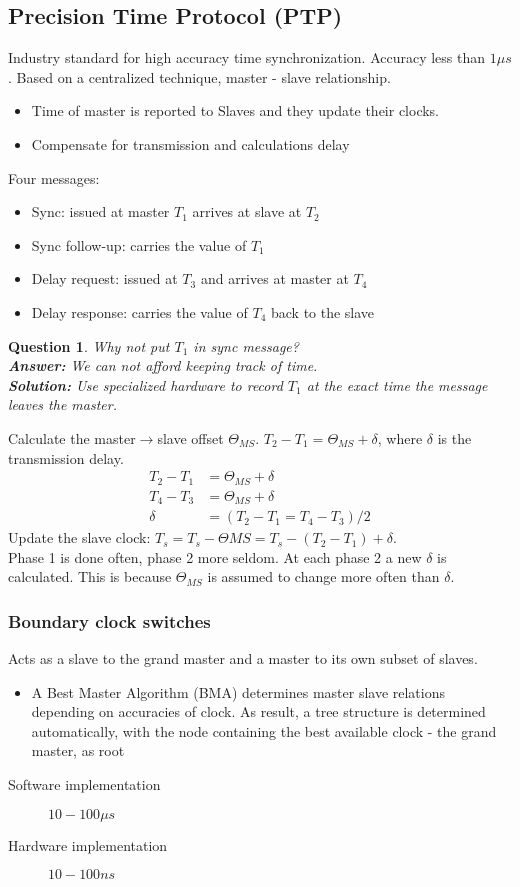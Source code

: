 \documentclass[a4paper]{article}
\newtheorem{question}{Question}
\begin{document}
\subsection{Precision Time Protocol (PTP)}
Industry standard for high accuracy time synchronization. Accuracy less than
$1\mu s$. Based on a centralized technique, master - slave relationship.
\begin{itemize}
		\item Time of master is reported to Slaves and they update their clocks.
		\item Compensate for transmission and calculations delay
\end{itemize}
Four messages:
\begin{itemize}
		\item Sync: issued at master $T_1$ arrives at slave at $T_2$
		\item Sync follow-up: carries the value of $T_1$
		\item Delay request: issued at $T_3$ and arrives at master at $T_4$
		\item Delay response: carries the value of $T_4$ back to the slave
\end{itemize}
\begin{question}
		Why not put $T_1$ in sync message?\\
		\textbf{Answer:} We can not afford keeping track of time.\\
		\textbf{Solution:} Use specialized hardware to record $T_1$ at the exact
		time the message leaves the master.
\end{question}
Calculate the master$\rightarrow$slave offset $\Theta_{MS}$.
$T_2-T_1=\Theta_{MS}+\delta$, where $\delta$ is the transmission delay.
\begin{align*}
		T_2-T_1&=\Theta_{MS} + \delta\\
		T_4-T_3&=\Theta_{MS} + \delta\\
		\delta &= (T_2-T_1=T_4-T_3)/2
\end{align*}
Update the slave clock: $T_s=T_s-\Theta{MS} = T_s - (T_2-T_1)+\delta$.\\
Phase 1 is done often, phase 2 more seldom. At each phase 2 a new $\delta$ is
calculated. This is because $\Theta_{MS}$ is assumed to change more often than
$\delta$.
\subsubsection{Boundary clock switches}
Acts as a slave to the grand master and a master to its own subset of slaves.
\begin{itemize}
		\item A Best Master Algorithm (BMA) determines master slave relations
				depending on accuracies of clock. As result, a tree structure is
				determined automatically, with the node containing the best
				available clock - the grand master, as root
\end{itemize}
\begin{description}
		\item[Software implementation] $10-100\mu s$
		\item[Hardware implementation] $10-100ns$
\end{description}
\end{document}

